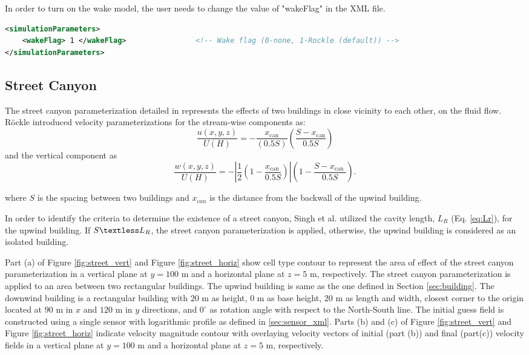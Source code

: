In order to turn on the wake model, the user needs to change the value of "wakeFlag" in the XML file.

\begin{lstlisting}[language=XML]
<simulationParameters>
  	<wakeFlag> 1 </wakeFlag> 				<!-- Wake flag (0-none, 1-Rockle (default)) -->
</simulationParameters>
\end{lstlisting}

\subsection{Street Canyon}

The street canyon parameterization detailed in \cite{singh2008evaluation} represents the effects of two buildings in close vicinity to each other, on the fluid flow. R\"{o}ckle \cite{rockle1990bestimmung} introduced velocity parameterizations for the stream-wise components as: 
\begin{equation}
\frac{u(x, y, z)}{U(H)}=-\frac{x_{\mathrm{can}}}{(0.5 S)}\left(\frac{S-x_{\mathrm{can}}}{0.5 S}\right)
\label{eq:u_can}
\end{equation}
and the vertical component as 
\begin{equation}
\frac{w(x, y, z)}{U(H)}=-\left|\frac{1}{2}\left(1-\frac{x_{\text {can }}}{0.5 S}\right)\right|\left(1-\frac{S-x_{\text {can }}}{0.5 S}\right).
\label{eq:w_can}
\end{equation}

where $S$ is the spacing between two buildings and $x_{can}$ is the distance from the backwall of the upwind building.

In order to identify the criteria to determine the existence of a street canyon, Singh et al. \cite{singh2008evaluation} utilized the cavity length, $L_R$ (Eq. \ref{eq:Lr}), for the upwind building. If $S \textless L_R$, the street canyon parameterization is applied, otherwise, the upwind building is considered as an isolated building.

Part (a) of Figure \ref{fig:street_vert} and Figure \ref{fig:street_horiz} show cell type contour to represent the area of effect of the street canyon parameterization in a vertical plane at $y=100$ m and a horizontal plane at $z=5$ m, respectively. The street canyon parameterization is applied to an area between two rectangular buildings. The upwind building is same as the one defined in Section \ref{sec:building}. The downwind building is a rectangular building with $20$ m as height, $0$ m as base height, $20$ m as length and width, closest corner to the origin located at $90$ m in $x$ and $120$ m in $y$ directions, and $0^{\circ}$ as rotation angle with respect to the North-South line. The initial guess field is constructed using a single sensor with logarithmic profile as defined in \ref{sec:sensor_xml}. Parts (b) and (c) of Figure \ref{fig:street_vert} and Figure \ref{fig:street_horiz} indicate velocity magnitude contour with overlaying velocity vectors of initial (part (b)) and final (part(c)) velocity fields in a vertical plane at $y=100$ m and a horizontal plane at $z=5$ m, respectively.

